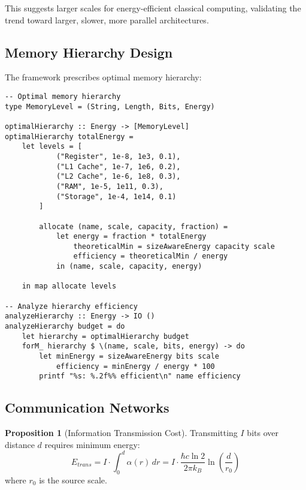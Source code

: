 \documentclass[11pt,a4paper]{article}
\theoremstyle{definition}
\newtheorem{proposition}[theorem]{Proposition}
\begin{document}
This suggests larger scales for energy-efficient classical computing, validating the trend toward larger, slower, more parallel architectures.

\subsection{Memory Hierarchy Design}

The framework prescribes optimal memory hierarchy:

\begin{lstlisting}
-- Optimal memory hierarchy
type MemoryLevel = (String, Length, Bits, Energy)

optimalHierarchy :: Energy -> [MemoryLevel]
optimalHierarchy totalEnergy =
    let levels = [
            ("Register", 1e-8, 1e3, 0.1),
            ("L1 Cache", 1e-7, 1e6, 0.2),
            ("L2 Cache", 1e-6, 1e8, 0.3),
            ("RAM", 1e-5, 1e11, 0.3),
            ("Storage", 1e-4, 1e14, 0.1)
        ]
        
        allocate (name, scale, capacity, fraction) =
            let energy = fraction * totalEnergy
                theoreticalMin = sizeAwareEnergy capacity scale
                efficiency = theoreticalMin / energy
            in (name, scale, capacity, energy)
            
    in map allocate levels

-- Analyze hierarchy efficiency
analyzeHierarchy :: Energy -> IO ()
analyzeHierarchy budget = do
    let hierarchy = optimalHierarchy budget
    forM_ hierarchy $ \(name, scale, bits, energy) -> do
        let minEnergy = sizeAwareEnergy bits scale
            efficiency = minEnergy / energy * 100
        printf "%s: %.2f%% efficient\n" name efficiency
\end{lstlisting}

\subsection{Communication Networks}

\begin{proposition}[Information Transmission Cost]
Transmitting $I$ bits over distance $d$ requires minimum energy:
\begin{equation}
E_{trans} = I \cdot \int_0^d \alpha(r) \, dr = I \cdot \frac{\hbar c \ln 2}{2\pi k_B} \ln\left(\frac{d}{r_0}\right)
\end{equation}
where $r_0$ is the source scale.
\end{proposition}
\end{document}
